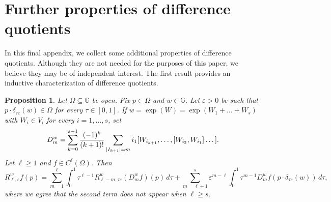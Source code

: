 \documentclass[11pt]{amsart}
\newcommand{\Om}{\Omega}
\newcommand{\eps}{\varepsilon}
\DeclarePairedDelimiter{\abs}{\lvert}{\rvert}
\theoremstyle{plain}
\newtheorem{proposition}[theorem]{Proposition}
\theoremstyle{definition}
\theoremstyle{remark}
\numberwithin{equation}{section}
\begin{document}
\section{Further properties of difference quotients}\label{sec_appendix}
In this final appendix, we collect some additional properties of difference quotients. Although they are not needed for the purposes of this paper, we believe they may be of independent interest. The first result provides an inductive characterization of difference quotients.
\begin{proposition}
Let $\Om \subseteq \mathbb{G}$ be open. Fix $p \in \Om$ and $w \in \mathbb{G}$. Let $\eps>0$ be such that $p \cdot \delta_{\tau\eps}(w) \in \Om$ for every $\tau \in [0,1]$. If $w=\exp(W)=\exp(W_1+\dots+W_s)$ with $W_i \in V_i$ for every $i=1,\dots,s$, set 
\begin{equation*}
D^w_m=\sum_{k=0}^{s-1} \frac{(-1)^k}{(k+1)!} \sum_{\abs*{I_{k+1}}=m} i_1 [W_{i_{k+1}},\dots,[W_{i_2},W_{i_1}]\dots].
\end{equation*}
 Let $\ell \geq 1$ and $f \in C^\ell(\Om)$. Then
\begin{equation*}
R^w_{\ell,\eps} f(p)=\sum_{m=1}^\ell \int_0^1 \tau^{\ell-1} R^w_{\ell-m,\tau \eps}(D^w_m f)(p) \,d\tau + \sum_{m=\ell+1}^s \eps^{m-\ell} \int_0^1 \tau^{m-1} D^w_m f(p \cdot \delta_{\tau\eps}(w)) \,d\tau,
\end{equation*}
where we agree that the second term does not appear when $\ell\geq s$.

\end{proposition}
\end{document}

